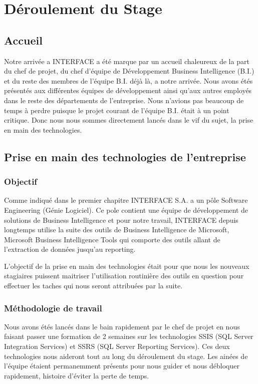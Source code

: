 \chapter{Déroulement du Stage}

\section{Accueil}
Notre arrivée a INTERFACE a été marque par un accueil chaleureux de la part du chef de projet, du chef d’équipe de Développement Business Intelligence (B.I.) et du reste des membres de l’équipe B.I. déjà là, a notre arrivée. Nous avons étés présentés aux différentes équipes de développement ainsi qu’aux autres employés dans le reste des départements de l’entreprise. Nous n’avions pas beaucoup de temps à perdre puisque le projet courant de l’équipe B.I. était à un point critique. Donc nous nous sommes directement lancés dans le vif du sujet, la prise en main des technologies. 

\section{Prise en main des technologies de l'entreprise}
\subsection{Objectif}
Comme indiqué dans le premier chapitre INTERFACE S.A. a un pôle Software Engineering (Génie Logiciel). Ce pole contient une équipe de développement de solutions de Business Intelligence et pour notre travail, INTERFACE depuis longtemps utilise la suite des outils de Business Intelligence de Microsoft, Microsoft Business Intelligence Tools qui comporte des outils allant de l’extraction de données jusqu’au reporting.

L’objectif de la prise en main des technologies était pour que nous les nouveaux stagiaires puissent maitriser l’utilisation routinière des outils en question pour effectuer les taches qui nous seront attribuées par la suite.

\subsection{Méthodologie de travail}
Nous avons étés lancés dans le bain rapidement par le chef de projet en nous faisant passer une formation de 2 semaines sur les technologies SSIS (SQL Server Integration Services) et SSRS (SQL Server Reporting Services). Ces deux technologies nous aideront tout au long du déroulement du stage. Les ainées de l’équipe étaient permanemment présents pour nous guider et nous débloquer rapidement, histoire d’éviter la perte de temps.
